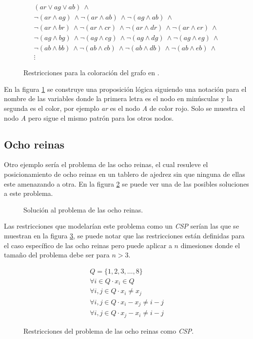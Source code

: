 \begin{figure}
\begin{align*}
    (ar \lor ag \lor ab)\ \land\\
    \neg(ar \land ag)\ \land \neg(ar \land ab)\ \land \neg(ag \land ab)\ \land\\
    \neg(ar \land br)\ \land \neg(ar \land cr)\ \land \neg(ar \land dr)\ \land \neg(ar \land er)\ \land\\
    \neg(ag \land bg)\ \land \neg(ag \land cg)\ \land \neg(ag \land dg)\ \land \neg(ag \land eg)\ \land\\
    \neg(ab \land bb)\ \land \neg(ab \land cb)\ \land \neg(ab \land db)\ \land \neg(ab \land eb)\ \land\\
    \vdots
\end{align*}
\caption{Restricciones para la coloración del grafo en \sat.}
\label{fig:g_col_sat}
\end{figure}

En la figura \ref{fig:g_col_sat} se construye una proposición lógica siguiendo una notación para el nombre de las variables donde la primera letra es el nodo en minúsculas y la segunda es el color, por ejemplo \textit{ar} es el nodo \textit{A} de color rojo. Solo se muestra el nodo \textit{A} pero sigue el mismo patrón para los otros nodos.

\subsection{Ocho reinas}

Otro ejemplo sería el problema de las ocho reinas, el cual resuleve el posicionamiento de ocho reinas en un tablero de ajedrez sin que ninguna de ellas este amenazando a otra. En la figura \ref{fig:queens} se puede ver una de las posibles soluciones a este problema.

\begin{figure}
\centering
\newgame
{}
\showboard
\caption{Solución al problema de las ocho reinas.}
\label{fig:queens}
\end{figure}

Las restricciones que modelarían este problema como un \textit{CSP} serían las que se muestran en la figura \ref{fig:queens_csp}, se puede notar que las restricciones están definidas para el caso específico de las ocho reinas pero puede aplicar a $n$ dimesiones donde el tamaño del problema debe ser para $n > 3$.

\begin{figure}
\begin{align*}
    Q = \{1, 2, 3, \dots, 8\}\\
    \forall i \in Q \cdot x_i \in Q\\
    \forall i,j \in Q \cdot x_i \neq x_j\\
    \forall i,j \in Q \cdot x_i - x_j \neq i - j\\
    \forall i,j \in Q \cdot x_j - x_i \neq i - j
\end{align*}
\caption{Restricciones del problema de las ocho reinas como \textit{CSP}.}
\label{fig:queens_csp}
\end{figure}

